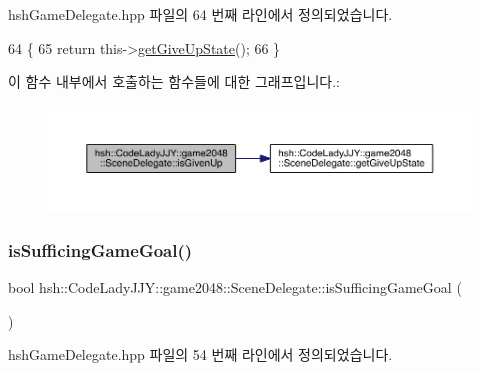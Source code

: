 hsh\+Game\+Delegate.\+hpp 파일의 64 번째 라인에서 정의되었습니다.


\begin{DoxyCode}
64                                 \{
65                     \textcolor{keywordflow}{return} this->\hyperlink{classhsh_1_1_code_lady_j_j_y_1_1game2048_1_1_scene_delegate_abe91b73b30ea51884c07d50f4a9664f3}{getGiveUpState}();
66                 \}
\end{DoxyCode}
이 함수 내부에서 호출하는 함수들에 대한 그래프입니다.\+:
\nopagebreak
\begin{figure}[H]
\begin{center}
\leavevmode
\includegraphics[width=350pt]{d7/d4d/classhsh_1_1_code_lady_j_j_y_1_1game2048_1_1_scene_delegate_a66c164970bd5d826ca85deaeea30167b_cgraph}
\end{center}
\end{figure}
\mbox{\label{classhsh_1_1_code_lady_j_j_y_1_1game2048_1_1_scene_delegate_a590a3df7299ee2118db8556d7d594460}} 
\subsubsection{\texorpdfstring{is\+Sufficing\+Game\+Goal()}{isSufficingGameGoal()}}
{\footnotesize\ttfamily bool hsh\+::\+Code\+Lady\+J\+J\+Y\+::game2048\+::\+Scene\+Delegate\+::is\+Sufficing\+Game\+Goal (\begin{DoxyParamCaption}{ }\end{DoxyParamCaption})\hspace{0.3cm}{\ttfamily [inline]}}



hsh\+Game\+Delegate.\+hpp 파일의 54 번째 라인에서 정의되었습니다.


